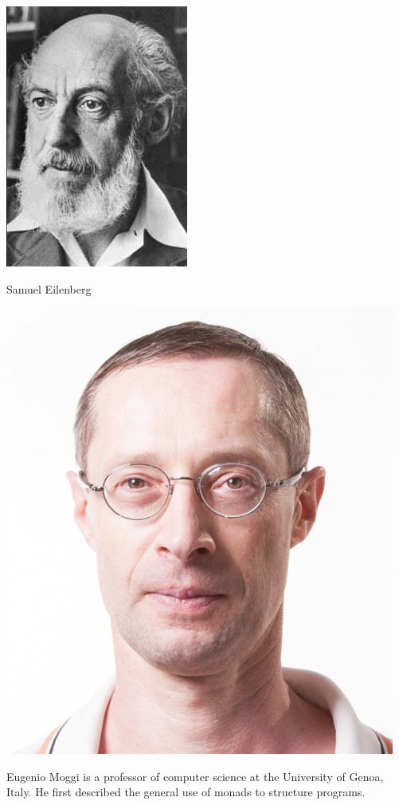 \documentclass[12pt]{article}
\theoremstyle{definition}
\begin{document}
\begin{center}
\includegraphics[scale=0.6]{eilenberg}

Samuel Eilenberg
\end{center}

\begin{center}
\includegraphics[scale=0.3]{moggi}
\end{center}

Eugenio Moggi is a professor of computer science at the University of Genoa, Italy.
He first described the general use of monads to structure programs.
\end{document}
